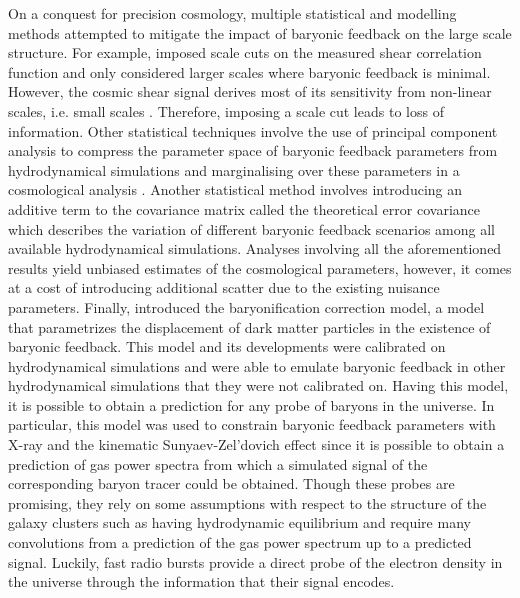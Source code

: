 On a conquest for precision cosmology, multiple statistical and modelling methods attempted to mitigate the impact of baryonic feedback on the large scale structure. For example, \citet{krause2021dark} imposed scale cuts on the measured shear correlation function and only considered larger scales where baryonic feedback is minimal. However, the cosmic shear signal derives most of its sensitivity from non-linear scales, i.e. small scales \citep{Piccirilli_Zennaro_García-García_Alonso_2025}. Therefore, imposing a scale cut leads to loss of information. Other statistical techniques involve the use of principal component analysis to compress the parameter space of baryonic feedback parameters from hydrodynamical simulations and marginalising over these parameters in a cosmological analysis \citep{Eifler_Krause_Dodelson_Zentner_Hearin_Gnedin_2015}. Another statistical method involves introducing an additive term to the covariance matrix called the theoretical error covariance \citep{Moreira_2021, Maraio_2025a} which describes the variation of different baryonic feedback scenarios among all available hydrodynamical simulations. Analyses involving all the aforementioned results yield unbiased estimates of the cosmological parameters, however, it comes at a cost of introducing additional scatter due to the existing nuisance parameters. Finally, \citet{Schneider_Teyssier_2015} introduced the baryonification correction model, a model that parametrizes the displacement of dark matter particles in the existence of baryonic feedback. This model and its developments \citep{Schneider_Kovač_etal._2025} were calibrated on hydrodynamical simulations and were able to emulate baryonic feedback in other hydrodynamical simulations that they were not calibrated on. Having this model, it is possible to obtain a prediction for any probe of baryons in the universe. In particular, this model was used to constrain baryonic feedback parameters with X-ray and the kinematic Sunyaev-Zel'dovich effect \citep{Kovač_2025} since it is possible to obtain a prediction of gas power spectra from which a simulated signal of the corresponding baryon tracer could be obtained. Though these probes are promising, they rely on some assumptions with respect to the structure of the galaxy clusters such as having hydrodynamic equilibrium and require many convolutions from a prediction of the gas power spectrum up to a predicted signal. Luckily, fast radio bursts provide a direct probe of the electron density in the universe through the information that their signal encodes.

